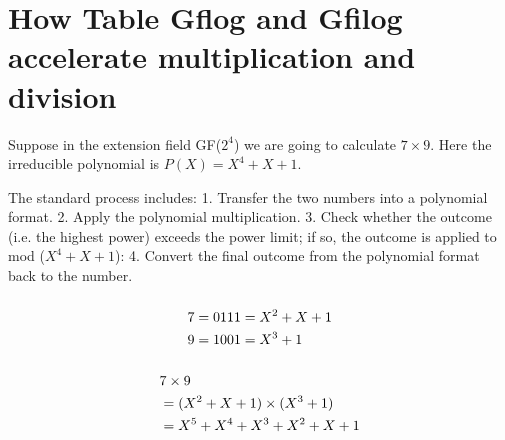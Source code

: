 \documentclass[journal]{IEEEtran}
\begin{document}

%


\appendices
\section{How Table Gflog and Gfilog accelerate multiplication and division}

Suppose in the extension field GF($2^4$) we are going to calculate \(7 \times 9\). Here the irreducible polynomial is $P(X) = X^4 + X + 1$.

The standard process includes: 1. Transfer the two numbers into a polynomial format. 2. Apply the polynomial multiplication. 3. Check whether the outcome (i.e. the highest power) exceeds the power limit; if so, the outcome is applied to mod ($X^4 + X + 1$): 4. Convert the final outcome from the polynomial format back to the number.

\subsubsection{}
    \begin{align}
        7 &= 0111 = X^2 + X + 1\notag\\ 
        9 &= 1001 = X^3 + 1 \notag
    \end{align}

\subsubsection{}
    \begin{align}
        &7 \times 9\notag\\
        &= (X^2 + X + 1) \times (X^3 + 1)\notag\\
        &= X^5 + X^4 + X^3 + X^2 + X + 1\notag
    \end{align}
\end{document}
